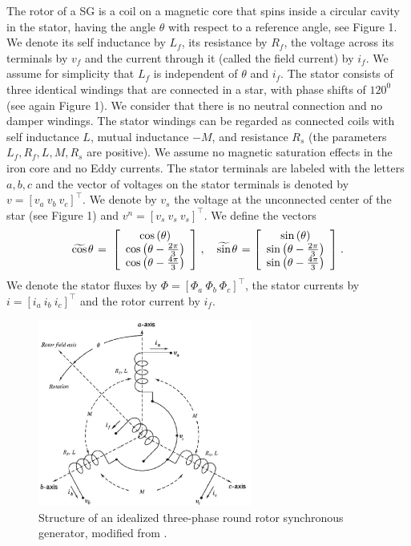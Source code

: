 \documentclass[letterpaper, 10 pt, conference]{ieeeconf}
\newcommand{\m}      {{\hbox{\hskip 1pt}}}
\begin{document}
The rotor of a SG is a coil on a magnetic core that spins
inside a circular cavity in the stator, having the angle $\theta$ with
respect to a reference angle, see Figure 1. We denote its self
inductance by $L_f$, its resistance by $R_f$, the voltage across its
terminals by $v_f$ and the current through it (called the field
current) by $i_f$. We assume for simplicity that $L_f$ is independent
of $\theta$ and $i_f$. The stator consists of three identical windings
that are connected in a star, with phase shifts of $120^0$ (see again
Figure 1). We consider that there is no neutral connection and no
damper windings. The stator windings can be regarded as connected
coils with self inductance $L$, mutual inductance $-M$, and resistance
$R_s$ (the parameters $L_f,R_f,L,M,R_s$ are positive). We assume no
magnetic saturation effects in the iron core and no Eddy currents. The
stator terminals are labeled with the letters $a,b,c$ and the vector
of voltages on the stator terminals is denoted by $v=\left[v_a\ v_b\
v_c\right]^\top$. We denote by $v_s$ the voltage at the unconnected 
center of the star (see Figure 1) and $v^n=[v_s\ v_s\ v_s]^\top$.
We define the vectors
$$ \widetilde{\cos}\m\theta \m=\m \left[\begin{array}{c} \cos\left(
   \theta\right)\\ \cos\left(\theta-\frac{2\pi}{3}\right)\\
   \cos\left(\theta-\frac{4\pi}{3}\right) \end{array}\right] \m,\quad
   \widetilde{\sin}\m\theta \m= \left[\begin{array}{c} \sin\left(
   \theta\right)\\ \sin\left(\theta-\frac{2\pi}{3}\right)\\ \sin\left
   (\theta-\frac{4\pi}{3}\right) \end{array}\right] \m.$$
We denote the stator fluxes by $\Phi=\left[\Phi_a\ \Phi_b\ \Phi_c
\right]^\top$, the stator currents by $i=\left[i_a\ i_b\ i_c\right]
^\top$ and the rotor current by $i_f$. 

\begin{figure} %
\centering \includegraphics[width=7cm]{SGStructure.eps}
\caption[Structure of an idealized three-phase round rotor synchronous
generator]{Structure of an idealized three-phase round rotor
synchronous generator, modified from \cite[Figure 3.4]{GrSt2014}.}
\label{fig:structOfSG} \vspace{-3mm}
\end{figure}
\end{document}
